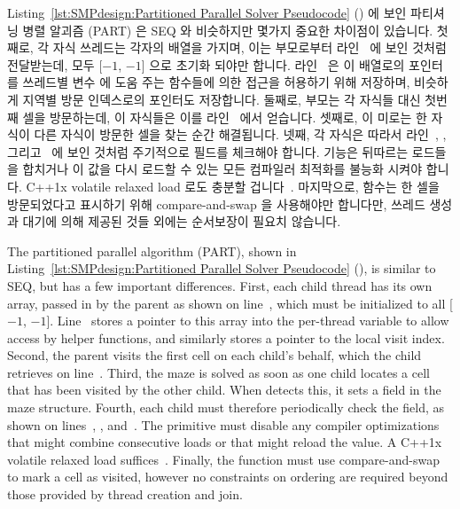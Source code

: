 \begin{fcvref}
Listing~\ref{lst:SMPdesign:Partitioned Parallel Solver Pseudocode}
() 에 보인 파티셔닝 병렬 알괴즘 (PART) 은 SEQ 와 비슷하지만
몇가지 중요한 차이점이 있습니다.
첫째로, 각 자식 쓰레드는 각자의  배열을 가지며, 이는 부모로부터
라인~ 에 보인 것처럼 전달받는데, 모두 [$-1$, $-1$] 으로 초기화 되야만
합니다.
라인~ 은 이 배열로의 포인터를 쓰레드별 변수  에
도움 주는 함수들에 의한 접근을 허용하기 위해 저장하며, 비슷하게 지역별 방문
인덱스로의 포인터도 저장합니다.
둘째로, 부모는 각 자식들 대신 첫번째 셀을 방문하는데, 이 자식들은 이를
라인~ 에서 얻습니다.
셋째로, 이 미로는 한 자식이 다른 자식이 방문한 셀을 찾는 순간 해결됩니다.
넷째, 각 자식은 따라서 라인~, ,
그리고~ 에 보인 것처럼 주기적으로  필드를 체크해야
합니다.
 기능은 뒤따르는 로드들을 합치거나 이 값을 다시 로드할 수 있는
모든 컴파일러 최적화를 불능화 시켜야 합니다.
C++1x volatile relaxed load 로도 충분할 겁니다~\cite{RichardSmith2019N4800}.
마지막으로,  함수는 한 셀을 방문되었다고 표시하기
위해 compare-and-swap 을 사용해야만 합니다만, 쓰레드 생성과 대기에 의해 제공된
것들 외에는 순서보장이 필요치 않습니다.
\end{fcvref}

\iffalse

\begin{fcvref}
The partitioned parallel algorithm (PART), shown in
Listing~\ref{lst:SMPdesign:Partitioned Parallel Solver Pseudocode}
(),
is similar to SEQ, but has a few important differences.
First, each child thread has its own  array, passed in by
the parent as shown on line~,
which must be initialized to all [$-1$, $-1$].
Line~ stores a pointer to this array into the per-thread variable
 to allow access by helper functions, and similarly stores
a pointer to the local visit index.
Second, the parent visits the first cell on each child's behalf,
which the child retrieves on line~.
Third, the maze is solved as soon as one child locates a cell that has
been visited by the other child.
When  detects this,
it sets a  field in the maze structure.
Fourth, each child must therefore periodically check the 
field, as shown on lines~, , and~.
The  primitive must disable any compiler
optimizations that might combine consecutive loads or that
might reload the value.
A C++1x volatile relaxed load suffices~\cite{RichardSmith2019N4800}.
Finally, the  function must use
compare-and-swap to mark a cell as visited, however
no constraints on ordering are required beyond those provided by
thread creation and join.
\end{fcvref}

